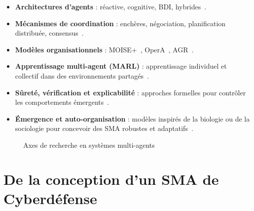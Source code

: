 \documentclass[ twoside,openright,titlepage,numbers=noenddot,headinclude,%
                footinclude=true,cleardoublepage=empty,abstractoff, %
                BCOR=5mm,paper=a4,fontsize=11pt,%
                french,american,%
                ]{scrreprt}
\begin{document}
\begin{itemize}
    \item \textbf{Architectures d'agents} : réactive, cognitive, BDI, hybrides~\cite{Georgeff1999}.
    \item \textbf{Mécanismes de coordination} : enchères, négociation, planification distribuée, consensus~\cite{Sandholm1999,Durfee1999}.
    \item \textbf{Modèles organisationnels} : MOISE+~\cite{Hubner2002,Hannoun2000}, OperA~\cite{Dignum2004}, AGR~\cite{Ferber2003}.
    \item \textbf{Apprentissage multi-agent (MARL)} : apprentissage individuel et collectif dans des environnements partagés~\cite{Zhang2021}.
    \item \textbf{Sûreté, vérification et explicabilité} : approches formelles pour contrôler les comportements émergents~\cite{Boella2008}.
    \item \textbf{Émergence et auto-organisation} : modèles inspirés de la biologie ou de la sociologie pour concevoir des SMA robustes et adaptatifs~\cite{DiMarzoSerugendo2005,Heylighen2001}.
\end{itemize}

\begin{figure}[h]
    \centering
    \caption{Axes de recherche en systèmes multi-agents}
    \label{fig:panorama_sma}
\end{figure}


\section{De la conception d'un SMA de Cyberdéfense}\label{sec:problematique-sma-aica}
\end{document}
